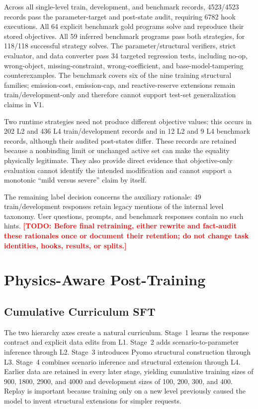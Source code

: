 \documentclass[lettersize,journal]{IEEEtran}
\newcommand{\drafttodo}[1]{\textcolor{red}{\textbf{[TODO: #1]}}}
\begin{document}
Across all single-level train, development, and benchmark records, 4523/4523 records pass the parameter-target and post-state audit, requiring 6782 hook executions. All 64 explicit benchmark gold programs solve and reproduce their stored objectives. All 59 inferred benchmark programs pass both strategies, for 118/118 successful strategy solves. The parameter/structural verifiers, strict evaluator, and data converter pass 34 targeted regression tests, including no-op, wrong-object, missing-constraint, wrong-coefficient, and base-model-tampering counterexamples. The benchmark covers six of the nine training structural families; emission-cost, emission-cap, and reactive-reserve extensions remain train/development-only and therefore cannot support test-set generalization claims in V1.

Two runtime strategies need not produce different objective values: this occurs in 202 L2 and 436 L4 train/development records and in 12 L2 and 9 L4 benchmark records, although their audited post-states differ. These records are retained because a nonbinding limit or unchanged active set can make the equality physically legitimate. They also provide direct evidence that objective-only evaluation cannot identify the intended modification and cannot support a monotonic ``mild versus severe'' claim by itself.

The remaining label decision concerns the auxiliary rationale: 49 train/development responses retain legacy mentions of the internal level taxonomy. User questions, prompts, and benchmark responses contain no such hints. \drafttodo{Before final retraining, either rewrite and fact-audit these rationales once or document their retention; do not change task identities, hooks, results, or splits.}

\section{Physics-Aware Post-Training}
\subsection{Cumulative Curriculum SFT}
The two hierarchy axes create a natural curriculum. Stage~1 learns the response contract and explicit data edits from L1. Stage~2 adds scenario-to-parameter inference through L2. Stage~3 introduces Pyomo structural construction through L3. Stage~4 combines scenario inference and structural extension through L4. Earlier data are retained in every later stage, yielding cumulative training sizes of 900, 1800, 2900, and 4000 and development sizes of 100, 200, 300, and 400. Replay is important because training only on a new level previously caused the model to invent structural extensions for simpler requests.
\end{document}

